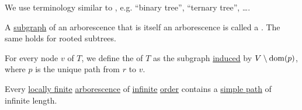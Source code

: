 \begin{definition}
\begin{thmenum}
    We use terminology similar to , e.g. \enquote{binary tree}, \enquote{ternary tree}, \ldots.

     A \hyperref[def:theory_of_graphs/submodel]{subgraph} of an arborescence that is itself an arborescence is called a . The same holds for rooted subtrees.

    For every node \( v \) of \( T \), we define the  of \( T \) as the subgraph \hyperref[def:hypergraph/submodel]{induced} by \( V \setminus \operatorname{dom}(p) \), where \( p \) is the unique path from \( r \) to \( v \).
  \end{thmenum}
\end{definition}

\begin{theorem}\label{thm:konigs_lemma}
  Every \hyperref[def:hypergraph/degree]{locally finite} \hyperref[def:arborescence]{arborescence} of \hyperref[def:hypergraph/order]{infinite} \hyperref[def:hypergraph/order]{order} contains a \hyperref[def:graph_adjancency_chain/simple]{simple path} of infinite length.
\end{theorem}
